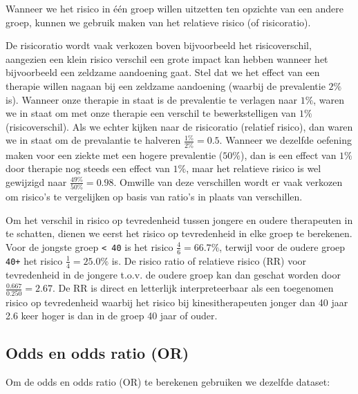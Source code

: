\documentclass[
]{book}
\theoremstyle{definition}
\theoremstyle{definition}
\theoremstyle{definition}
\theoremstyle{definition}
\theoremstyle{remark}
\begin{document}
Wanneer we het risico in één groep willen uitzetten ten opzichte van een andere groep, kunnen we gebruik maken van het relatieve risico (of risicoratio).

De risicoratio wordt vaak verkozen boven bijvoorbeeld het risicoverschil, aangezien een klein risico verschil een grote impact kan hebben wanneer het bijvoorbeeld een zeldzame aandoening gaat. Stel dat we het effect van een therapie willen nagaan bij een zeldzame aandoening (waarbij de prevalentie \(2 \%\) is). Wanneer onze therapie in staat is de prevalentie te verlagen naar \(1 \%\), waren we in staat om met onze therapie een verschil te bewerkstelligen van \(1 \%\) (risicoverschil). Als we echter kijken naar de risicoratio (relatief risico), dan waren we in staat om de prevalantie te halveren \(\frac{1\%}{2\%} = 0.5\). Wanneer we dezelfde oefening maken voor een ziekte met een hogere prevalentie (\(50\%\)), dan is een effect van \(1\%\) door therapie nog steeds een effect van \(1\%\), maar het relatieve risico is wel gewijzigd naar \(\frac{49\%}{50\%} = 0.98\). Omwille van deze verschillen wordt er vaak verkozen om risico's te vergelijken op basis van ratio's in plaats van verschillen.

Om het verschil in risico op tevredenheid tussen jongere en oudere therapeuten in te schatten, dienen we eerst het risico op tevredenheid in elke groep te berekenen. Voor de jongste groep \texttt{\textless{}\ 40} is het risico \(\frac{4}{6} = 66.7 \%\), terwijl voor de oudere groep \texttt{40+} het risico \(\frac{1}{4} = 25.0 \%\) is. De risico ratio of relatieve risico (RR) voor tevredenheid in de jongere t.o.v. de oudere groep kan dan geschat worden door \(\frac{0.667}{0.250} = 2.67\). De RR is direct en letterlijk interpreteerbaar als een toegenomen risico op tevredenheid waarbij het risico bij kinesitherapeuten jonger dan 40 jaar 2.6 keer hoger is dan in de groep 40 jaar of ouder.

\hypertarget{odds-en-odds-ratio-or}{%
\subsection*{Odds en odds ratio (OR)}\label{odds-en-odds-ratio-or}}


Om de odds en odds ratio (OR) te berekenen gebruiken we dezelfde dataset:
\end{document}
